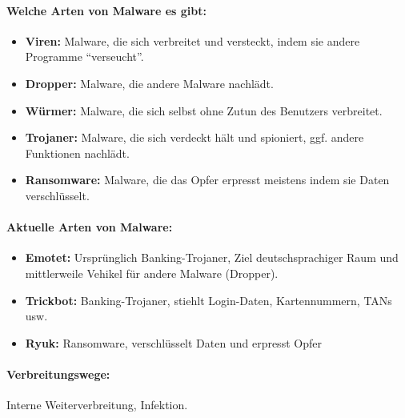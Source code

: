 \documentclass[10pt,a4paper]{article}
\begin{document}
\paragraph*{Welche Arten von Malware es gibt:}
\begin{itemize}[noitemsep,topsep=0pt,leftmargin=*]
    \item \textbf{Viren:} Malware, die sich verbreitet und versteckt, indem sie andere Programme "`verseucht"'.
    \item \textbf{Dropper:} Malware, die andere Malware nachlädt.
    \item \textbf{Würmer:} Malware, die sich selbst ohne Zutun des Benutzers verbreitet.
    \item \textbf{Trojaner:} Malware, die sich verdeckt hält und spioniert, ggf. andere Funktionen nachlädt.
    \item \textbf{Ransomware:} Malware, die das Opfer erpresst meistens indem sie Daten verschlüsselt.
\end{itemize}
\paragraph*{Aktuelle Arten von Malware:}
\begin{itemize}[noitemsep,topsep=0pt,leftmargin=*]
    \item \textbf{Emotet:} Ursprünglich Banking-Trojaner, Ziel deutschsprachiger Raum und mittlerweile Vehikel für andere Malware (Dropper).
    \item \textbf{Trickbot:} Banking-Trojaner, stiehlt Login-Daten, Kartennummern, TANs usw.
    \item \textbf{Ryuk:} Ransomware, verschlüsselt Daten und erpresst Opfer
\end{itemize}
\paragraph*{Verbreitungswege:} Interne Weiterverbreitung, Infektion.
\end{document}
